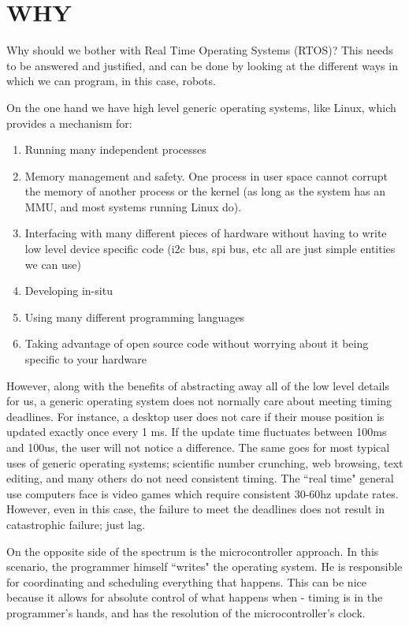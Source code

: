 \documentclass{article}
\begin{document}
\section{WHY}
Why should we bother with Real Time Operating Systems (RTOS)?  This needs to be answered and justified, and can be done by looking at the different ways in which we can program, in this case, robots.  

On the one hand we have high level generic operating systems, like Linux, which provides a mechanism for:
\begin{enumerate}
    \item Running many independent processes
    \item Memory management and safety.  One process in user space cannot corrupt the memory of another process or the kernel (as long as the system has an MMU, and most systems running Linux do).
    \item Interfacing with many different pieces of hardware without having to write low level device specific code (i2c bus, spi bus, etc all are just simple entities we can use)
    \item Developing in-situ
    \item Using many different programming languages
    \item Taking advantage of open source code without worrying about it being specific to your hardware 
\end{enumerate}

However, along with the benefits of abstracting away all of the low level details for us, a generic operating system does not normally care about meeting timing deadlines.  For instance, a desktop user does not care if their mouse position is updated exactly once every 1 ms.  If the update time fluctuates between 100ms and 100us, the user will not notice a difference.  The same goes for most typical uses of generic operating systems; scientific number crunching, web browsing, text editing, and many others do not need consistent timing.  The ``real time" general use computers face is video games which require consistent 30-60hz update rates.  However, even in this case, the failure to meet the deadlines does not result in catastrophic failure; just lag.

On the opposite side of the spectrum is the microcontroller approach.  In this scenario, the programmer himself ``writes" the operating system.  He is responsible for coordinating and scheduling everything that happens.  This can be nice because it allows for absolute control of what happens when - timing is in the programmer's hands, and has the resolution of the microcontroller's clock.
\end{document}
